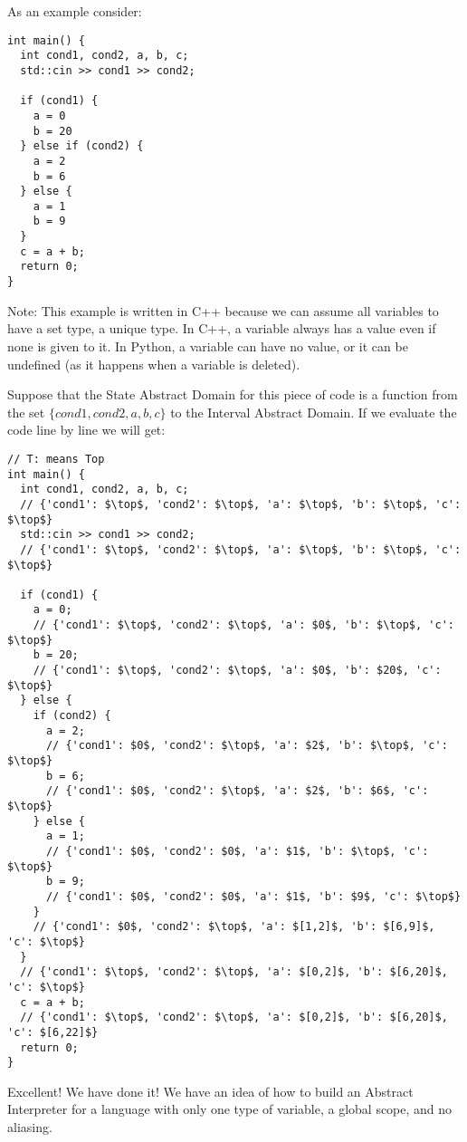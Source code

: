 As an example consider:

\begin{verbatim}
int main() {
  int cond1, cond2, a, b, c;
  std::cin >> cond1 >> cond2;

  if (cond1) {
    a = 0
    b = 20
  } else if (cond2) {
    a = 2
    b = 6
  } else {
    a = 1
    b = 9
  }
  c = a + b;
  return 0;
}
\end{verbatim}

Note: This example is written in C++ because we can assume all variables
to have a set type, a unique type. In C++, a variable always has a value
even if none is given to it. In Python, a variable can have no value, or
it can be undefined (as it happens when a variable is deleted).

Suppose that the State Abstract Domain for this piece of code is a
function from the set \(\{cond1, cond2, a, b, c\}\) to the Interval
Abstract Domain. If we evaluate the code line by line we will get:

\begin{verbatim}
// T: means Top
int main() {
  int cond1, cond2, a, b, c;
  // {'cond1': $\top$, 'cond2': $\top$, 'a': $\top$, 'b': $\top$, 'c': $\top$}
  std::cin >> cond1 >> cond2;
  // {'cond1': $\top$, 'cond2': $\top$, 'a': $\top$, 'b': $\top$, 'c': $\top$}

  if (cond1) {
    a = 0;
    // {'cond1': $\top$, 'cond2': $\top$, 'a': $0$, 'b': $\top$, 'c': $\top$}
    b = 20;
    // {'cond1': $\top$, 'cond2': $\top$, 'a': $0$, 'b': $20$, 'c': $\top$}
  } else {
    if (cond2) {
      a = 2;
      // {'cond1': $0$, 'cond2': $\top$, 'a': $2$, 'b': $\top$, 'c': $\top$}
      b = 6;
      // {'cond1': $0$, 'cond2': $\top$, 'a': $2$, 'b': $6$, 'c': $\top$}
    } else {
      a = 1;
      // {'cond1': $0$, 'cond2': $0$, 'a': $1$, 'b': $\top$, 'c': $\top$}
      b = 9;
      // {'cond1': $0$, 'cond2': $0$, 'a': $1$, 'b': $9$, 'c': $\top$}
    }
    // {'cond1': $0$, 'cond2': $\top$, 'a': $[1,2]$, 'b': $[6,9]$, 'c': $\top$}
  }
  // {'cond1': $\top$, 'cond2': $\top$, 'a': $[0,2]$, 'b': $[6,20]$, 'c': $\top$}
  c = a + b;
  // {'cond1': $\top$, 'cond2': $\top$, 'a': $[0,2]$, 'b': $[6,20]$, 'c': $[6,22]$}
  return 0;
}
\end{verbatim}

Excellent! We have done it! We have an idea of how to build an Abstract Interpreter for a
language with only one type of variable, a global scope, and no aliasing.

